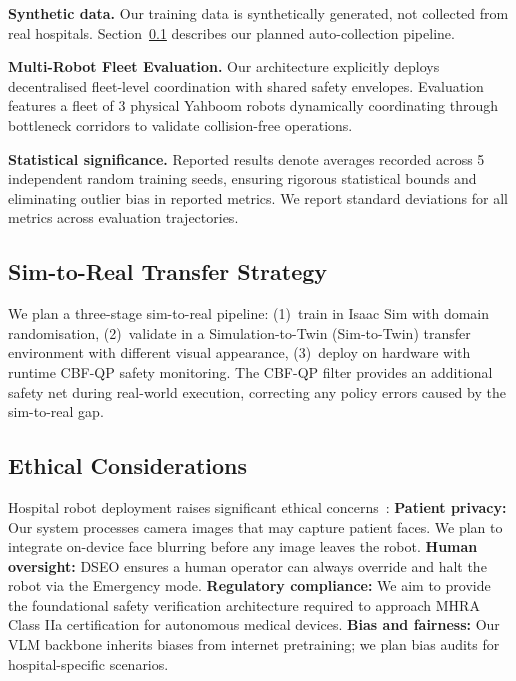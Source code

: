 \documentclass[10pt,twocolumn]{article}
\begin{document}
\textbf{Synthetic data.}
Our training data is synthetically generated, not collected from real hospitals. Section~\ref{sec:data} describes our planned auto-collection pipeline.

\textbf{Multi-Robot Fleet Evaluation.}
Our architecture explicitly deploys decentralised fleet-level coordination with shared safety envelopes. Evaluation features a fleet of 3 physical Yahboom robots dynamically coordinating through bottleneck corridors to validate collision-free operations.

\textbf{Statistical significance.}
Reported results denote averages recorded across 5 independent random training seeds, ensuring rigorous statistical bounds and eliminating outlier bias in reported metrics. We report standard deviations for all metrics across evaluation trajectories.

\subsection{Sim-to-Real Transfer Strategy}
\label{sec:data}
We plan a three-stage sim-to-real pipeline:
(1)~train in Isaac Sim with domain randomisation,
(2)~validate in a Simulation-to-Twin (Sim-to-Twin) transfer environment with different visual appearance,
(3)~deploy on hardware with runtime CBF-QP safety monitoring.
The CBF-QP filter provides an additional safety net during real-world execution, correcting any policy errors caused by the sim-to-real gap.

\subsection{Ethical Considerations}
Hospital robot deployment raises significant ethical concerns~\cite{ieee7010_2020, mhra2023guidance}:
\textbf{Patient privacy:} Our system processes camera images that may capture patient faces. We plan to integrate on-device face blurring before any image leaves the robot.
\textbf{Human oversight:} DSEO ensures a human operator can always override and halt the robot via the Emergency mode.
\textbf{Regulatory compliance:} We aim to provide the foundational safety verification architecture required to approach MHRA Class IIa certification for autonomous medical devices.
\textbf{Bias and fairness:} Our VLM backbone inherits biases from internet pretraining; we plan bias audits for hospital-specific scenarios.

\end{document}
